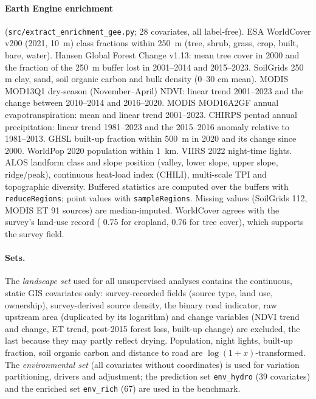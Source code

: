 \paragraph{Earth Engine enrichment} (\texttt{src/extract\_enrichment\_gee.py}; 28 covariates, all label-free). ESA WorldCover v200 (2021, \SI{10}{\metre}) class fractions within \SI{250}{\metre} (tree, shrub, grass, crop, built, bare, water). Hansen Global Forest Change v1.13: mean tree cover in 2000 and the fraction of the \SI{250}{\metre} buffer lost in 2001--2014 and 2015--2023. SoilGrids 250 m clay, sand, soil organic carbon and bulk density (0--30 cm mean). MODIS MOD13Q1 dry-season (November--April) NDVI: linear trend 2001--2023 and the change between 2010--2014 and 2016--2020. MODIS MOD16A2GF annual evapotranspiration: mean and linear trend 2001--2023. CHIRPS pentad annual precipitation: linear trend 1981--2023 and the 2015--2016 anomaly relative to 1981--2013. GHSL built-up fraction within \SI{500}{\metre} in 2020 and its change since 2000. WorldPop 2020 population within \SI{1}{\kilo\metre}. VIIRS 2022 night-time lights. ALOS landform class and slope position (valley, lower slope, upper slope, ridge/peak), continuous heat-load index (CHILI), multi-scale TPI and topographic diversity. Buffered statistics are computed over the buffers with \texttt{reduceRegions}; point values with \texttt{sampleRegions}. Missing values (SoilGrids 112, MODIS ET 91 sources) are median-imputed. WorldCover agrees with the survey's land-use record (\auc{} 0.75 for cropland, 0.76 for tree cover), which supports the survey field.

\paragraph{Sets.} The \emph{landscape set} used for all unsupervised analyses contains the continuous, static GIS covariates only: survey-recorded fields (source type, land use, ownership), survey-derived source density, the binary road indicator, raw upstream area (duplicated by its logarithm) and change variables (NDVI trend and change, ET trend, post-2015 forest loss, built-up change) are excluded, the last because they may partly reflect drying. Population, night lights, built-up fraction, soil organic carbon and distance to road are $\log(1+x)$-transformed. The \emph{environmental set} (all covariates without coordinates) is used for variation partitioning, drivers and adjustment; the prediction set \texttt{env\_hydro} (39 covariates) and the enriched set \texttt{env\_rich} (67) are used in the benchmark.

